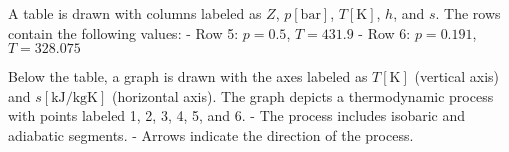 A table is drawn with columns labeled as \( Z \), \( p [\text{bar}] \), \( T [\text{K}] \), \( h \), and \( s \). The rows contain the following values:  
- Row 5: \( p = 0.5 \), \( T = 431.9 \)  
- Row 6: \( p = 0.191 \), \( T = 328.075 \)  

Below the table, a graph is drawn with the axes labeled as \( T [\text{K}] \) (vertical axis) and \( s [\text{kJ/kgK}] \) (horizontal axis). The graph depicts a thermodynamic process with points labeled 1, 2, 3, 4, 5, and 6.  
- The process includes isobaric and adiabatic segments.  
- Arrows indicate the direction of the process.